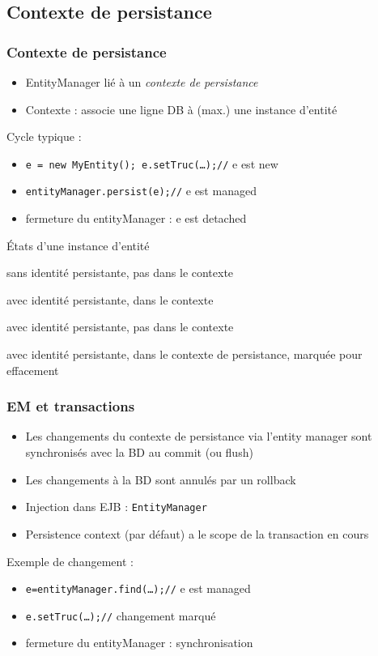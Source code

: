 \documentclass[english, french]{beamer}
\begin{document}
\subsection{Contexte de persistance}
\begin{frame}
	\frametitle{Contexte de persistance}
	\begin{itemize}
		\item EntityManager lié à un \emph{contexte de persistance}
		\item Contexte : associe une ligne DB à (max.) une instance d’entité
	\end{itemize}
	Cycle typique :
	\begin{itemize}
		\item \texttt{e = new MyEntity(); e.setTruc(…);//} e est \og{}new\fg{}
		\item \texttt{entityManager.persist(e);//} e est \og{}managed\fg{}
		\item fermeture du entityManager : e est \og{}detached\fg{}
	\end{itemize}
	\begin{block}{États d’une instance d’entité}
		\begin{description}[detached]
			\item[new] sans identité persistante, pas dans le contexte
			\item[managed] avec identité persistante, dans le contexte
			\item[detached] avec identité persistante, pas dans le contexte
			\item[removed] avec identité persistante, dans le contexte de persistance, marquée pour effacement
		\end{description}
	\end{block}
\end{frame}

\begin{frame}
	\frametitle{EM et transactions}
	\begin{itemize}
		\item Les changements du contexte de persistance via l’entity manager sont synchronisés avec la BD au commit {\tiny (ou flush)}
		\item Les changements à la BD sont annulés par un rollback
		\item Injection dans EJB :  \texttt{EntityManager}
		\item Persistence context (par défaut) a le scope de la transaction en cours
	\end{itemize}
	Exemple de changement :
	\begin{itemize}
		\item \texttt{e=entityManager.find(…);//} e est \og{}managed\fg{}
		\item \texttt{e.setTruc(…);//} changement marqué
		\item fermeture du entityManager : synchronisation
	\end{itemize}
\end{frame}
\end{document}
